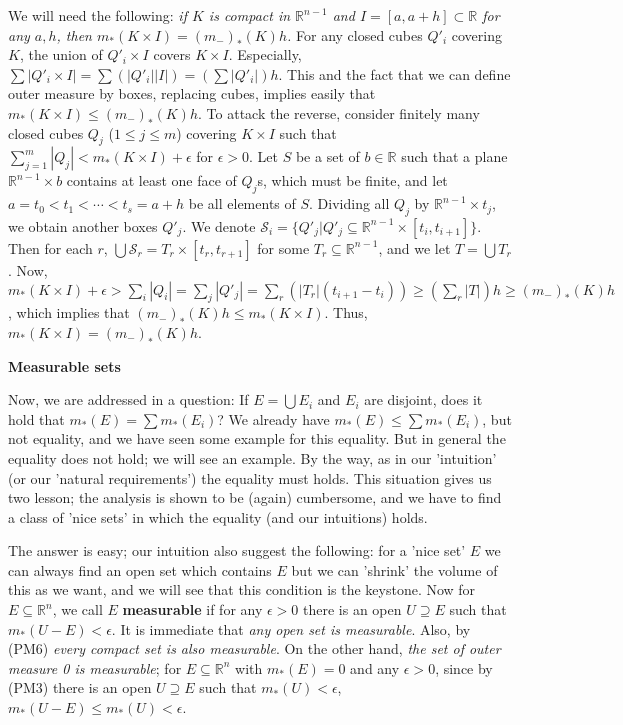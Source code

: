 \documentclass{article}
\newcommand{\ReR}{\mathbb{R}}
\begin{document}
We will need the following: \textit{if $K$ is compact in $\ReR^{n - 1}$ and $I = [a, a + h] \subset \ReR$ for any $a, h$, then $m_*(K \times I) = (m_-)_*(K)h$.}
For any closed cubes $Q'_i$ covering $K$, the union of $Q'_i \times I$ covers $K \times I$.
Especially, $\sum |Q'_i \times I| = \sum (|Q'_i||I|) = (\sum |Q'_i|) h$.
This and the fact that we can define outer measure by boxes, replacing cubes, implies easily that $m_*(K \times I) \le (m_-)_*(K)h$.
To attack the reverse, consider finitely many closed cubes $Q_j$ ($1 \le j \le m$) covering $K \times I$ such that $\sum_{j = 1}^m |Q_j| < m_*(K \times I) + \epsilon$ for $\epsilon > 0$.
Let $S$ be a set of $b \in \ReR$ such that a plane $\ReR^{n - 1} \times {b}$ contains at least one face of $Q_j$s, which must be finite, and let $a = t_0 < t_1 < \cdots < t_s = a + h$ be all elements of $S$.
Dividing all $Q_j$ by $\ReR^{n - 1} \times {t_j}$, we obtain another boxes $Q'_j$.
We denote $\mathcal{S}_i = \{Q'_j | Q'_j \subseteq \ReR^{n - 1} \times [t_i, t_{i + 1}]\}$.
Then for each $r$, $\bigcup \mathcal{S}_r = T_r \times [t_r, t_{r + 1}]$ for some $T_r \subseteq \ReR^{n - 1}$, and we let $T = \bigcup T_r$.
Now, $m_*(K \times I) + \epsilon > \sum_i |Q_i| = \sum_j |Q'_j| = \sum_r ( |T_r| (t_{i + 1} - t_i) ) \ge (\sum_r |T|) h \ge (m_-)_*(K) h$, which implies that $(m_-)_*(K) h \le m_*(K \times I)$.
Thus, $m_*(K \times I) = (m_-)_*(K) h$.

\newpage

\textbf{Measurable sets}

Now, we are addressed in a question: If $E = \bigcup E_i$ and $E_i$ are disjoint, does it hold that $m_*(E) = \sum m_*(E_i)$?
We already have $m_*(E) \le \sum m_*(E_i)$, but not equality, and we have seen some example for this equality.
But in general the equality does not hold; we will see an example.
By the way, as in our 'intuition' (or our 'natural requirements') the equality must holds.
This situation gives us two lesson; the analysis is shown to be (again) cumbersome, and we have to find a class of 'nice sets' in which the equality (and our intuitions) holds.

The answer is easy; our intuition also suggest the following: for a 'nice set' $E$ we can always find an open set which contains $E$ but we can 'shrink' the volume of this as we want, and we will see that this condition is the keystone.
Now for $E \subseteq \ReR^n$, we call $E$ \textbf{measurable} if for any $\epsilon > 0$ there is an open $U \supseteq E$ such that $m_*(U - E) < \epsilon$.
It is immediate that \textit{any open set is measurable}.
Also, by (PM6) \textit{every compact set is also measurable}.
On the other hand, \textit{the set of outer measure 0 is measurable}; for $E \subseteq \ReR^n$ with $m_*(E) = 0$ and any $\epsilon > 0$, since by (PM3) there is an open $U \supseteq E$ such that $m_*(U) < \epsilon$, $m_*(U - E) \le m_*(U) < \epsilon$.
\end{document}
